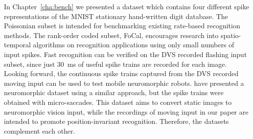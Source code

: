 %
In Chapter~\ref{cha:bench} we presented a dataset which contains four different spike representations of the MNIST stationary hand-written digit database. %
The Poissonian subset is intended for benchmarking existing rate-based recognition methods.
The rank-order coded subset, FoCal, encourages research into spatio-temporal algorithms on recognition applications using only small numbers of input spikes.
Fast recognition can be verified on the DVS recorded flashing input subset, since just 30~ms of useful spike trains are recorded for each image.
Looking forward, the continuous spike trains captured from the DVS recorded moving input can be used to test mobile neuromorphic robots.
\cite{orchard2015convert} have presented a neuromorphic dataset using a similar approach, but the spike trains were obtained with micro-saccades.
This dataset aims to convert static images to neuromorphic vision input, while the recordings of moving input in our paper are intended to promote position-invariant recognition.
Therefore, the datasets complement each other.

